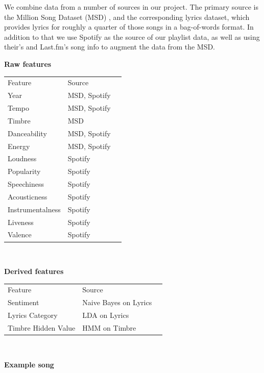 \documentclass[acmtog]{acmart}
\begin{document}
We combine data from a number of sources in our project. The primary source is the Million Song Dataset (MSD) \cite{msd}, and the corresponding lyrics dataset, which provides lyrics for roughly a quarter of those songs in a bag-of-words format. In addition to that we use Spotify \cite{spotify} as the source of our playlist data, as well as using their's and Last.fm's \cite{lastfm} song info to augment the data from the MSD.
\\
\begin{center} \textbf{Raw features} \end{center}
\begin{tabular}{lll}
Feature           & Source          \\
Year              & MSD, Spotify    \\
Tempo             & MSD, Spotify    \\
Timbre            & MSD             \\
Danceability      & MSD, Spotify    \\
Energy            & MSD, Spotify    \\
Loudness          & Spotify         \\
Popularity        & Spotify         \\
Speechiness       & Spotify         \\
Acousticness      & Spotify         \\
Instrumentalness  & Spotify         \\
Liveness          & Spotify         \\
Valence           & Spotify         \\
\end{tabular}
\\
\begin{center} \textbf{Derived features} \end{center}
\begin{tabular}{lll}
Feature               & Source                  \\
Sentiment             & Naive Bayes on Lyrics   \\
Lyrics Category       & LDA on Lyrics           \\
Timbre Hidden Value   & HMM on Timbre           \\
\end{tabular}
\\
\begin{center} \textbf{Example song} \end{center}
\end{document}
